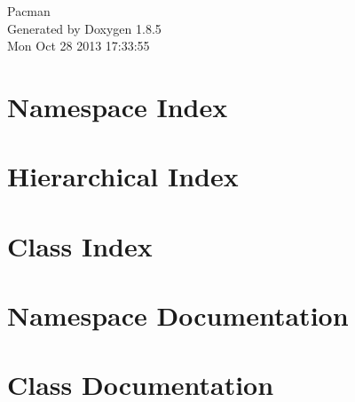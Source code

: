 \documentclass[twoside]{book}
\newcommand{\clearemptydoublepage}{%
  \newpage{\pagestyle{empty}\cleardoublepage}%
}
\begin{document}
\hypersetup{pageanchor=false}
\begin{titlepage}
\vspace*{7cm}
\begin{center}%
{\Large Pacman }\\
\vspace*{1cm}
{\large Generated by Doxygen 1.8.5}\\
\vspace*{0.5cm}
{\small Mon Oct 28 2013 17:33:55}\\
\end{center}
\end{titlepage}
\clearemptydoublepage
\tableofcontents
\clearemptydoublepage
{}
\hypersetup{pageanchor=true}

\chapter{Namespace Index}

\chapter{Hierarchical Index}

\chapter{Class Index}

\chapter{Namespace Documentation}

\chapter{Class Documentation}


























\newpage
{}
{}
\printindex
\end{document}
